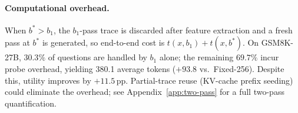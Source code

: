 \paragraph{Computational overhead.}
When $b^* > b_1$, the $b_1$-pass trace is discarded after feature extraction and a fresh pass at $b^*$ is generated, so end-to-end cost is $t(x, b_1) + t(x, b^*)$.
On GSM8K-27B, $30.3\%$ of questions are handled by $b_1$ alone; the remaining $69.7\%$ incur probe overhead, yielding 380.1 average tokens ($+93.8$ vs.\ Fixed-256).
Despite this, utility improves by $+11.5$\,pp.
Partial-trace reuse (KV-cache prefix seeding) could eliminate the overhead; see Appendix~\ref{app:two-pass} for a full two-pass quantification.
